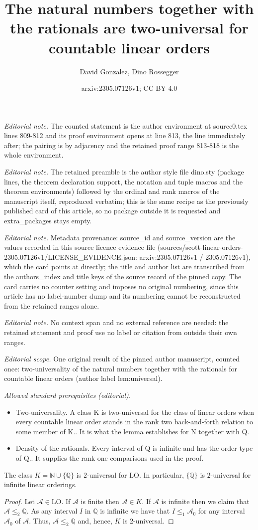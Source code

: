 \documentclass[10pt,a4paper]{amsart}
\title{The natural numbers together with the rationals are two-universal for countable linear orders}
\author{David Gonzalez, Dino Rossegger}
\date{arxiv:2305.07126v1; CC BY 4.0}
\providecommand{\A}{\mathcal{A}}
\providecommand{\LO}{\mathrm{LO}}
\newcommand{\Q}{\mathbb{Q}}
\begin{document}
\maketitle
\noindent\textit{Editorial note.} The counted statement is the author environment at source0.tex lines 809-812 and its proof environment opens at line 813, the line immediately after; the pairing is by adjacency and the retained proof range 813-818 is the whole environment.\par\medskip
\noindent\textit{Editorial note.} The retained preamble is the author style file dino.sty (package lines, the theorem declaration support, the notation and tuple macros and the theorem environments) followed by the ordinal and rank macros of the manuscript itself, reproduced verbatim; this is the same recipe as the previously published card of this article, so no package outside it is requested and extra\_packages stays empty.\par\medskip
\noindent\textit{Editorial note.} Metadata provenance: source\_id and source\_version are the values recorded in this source licence evidence file (sources/scott-linear-orders-2305.07126v1/LICENSE\_EVIDENCE.json: arxiv:2305.07126v1 / 2305.07126v1), which the card points at directly; the title and author list are transcribed from the authors\_index and title keys of the source record of the pinned copy. The card carries no counter setting and imposes no original numbering, since this article has no label-number dump and its numbering cannot be reconstructed from the retained ranges alone.\par\medskip
\noindent\textit{Editorial note.} No context span and no external reference are needed: the retained statement and proof use no label or citation from outside their own ranges.\par\medskip
\noindent\textit{Editorial scope.} One original result of the pinned author manuscript, counted once: two-universality of the natural numbers together with the rationals for countable linear orders (author label lem:universal).\par\medskip
\noindent\textit{Allowed standard prerequisites (editorial).}\begin{itemize}
\item Two-universality. A class K is two-universal for the class of linear orders when every countable linear order stands in the rank two back-and-forth relation to some member of K.. It is what the lemma establishes for N together with Q.
\item Density of the rationals. Every interval of Q is infinite and has the order type of Q.. It supplies the rank one comparisons used in the proof.
\end{itemize}\medskip
\begin{lemma}\label{lem:universal}
  The class $K=\mathbb N\cup\{\Q\}$ is $2$-universal for $\LO$. In particular,
  $\{\Q\}$ is $2$-universal for infinite linear orderings.
\end{lemma}

\begin{proof}
  Let $\A\in \LO$. If $\A$ is finite then $\A\in K$. If
  $\A$ is infinite then we claim that $\A\leq_2\Q$. As any interval $I$ in
  $\Q$ is infinite we have that $I\leq_1\A_0$ for any interval $\A_0$ of $\A$.
  Thus, $\A\leq_2\Q$ and, hence, $K$ is $2$-universal.
\end{proof}
\end{document}
